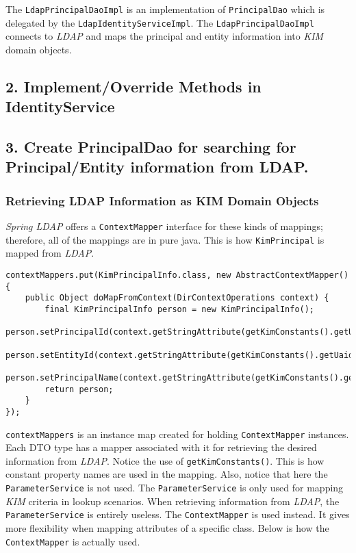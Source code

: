 \documentclass[12pt,notitlepage]{article}
\begin{document}
The \verb|LdapPrincipalDaoImpl| is an implementation of \verb|PrincipalDao| which is delegated by the 
\verb|LdapIdentityServiceImpl|. The \verb|LdapPrincipalDaoImpl| connects to \emph{LDAP} and maps the principal
and entity information into \emph{KIM} domain objects.

\subsection*{2. Implement/Override Methods in IdentityService}

\subsection*{3. Create PrincipalDao for searching for Principal/Entity information from LDAP.}
\subsubsection{Retrieving LDAP Information as KIM Domain Objects}
\emph{Spring LDAP} offers a \verb|ContextMapper| interface for these kinds of mappings; therefore, all of the
mappings are in pure java. This is how \verb|KimPrincipal| is mapped from \emph{LDAP}.

\begin{lstlisting}
contextMappers.put(KimPrincipalInfo.class, new AbstractContextMapper() {
    public Object doMapFromContext(DirContextOperations context) {
        final KimPrincipalInfo person = new KimPrincipalInfo();
        person.setPrincipalId(context.getStringAttribute(getKimConstants().getUaidLdapProperty()));
        person.setEntityId(context.getStringAttribute(getKimConstants().getUaidLdapProperty()));
        person.setPrincipalName(context.getStringAttribute(getKimConstants().getUidLdapProperty()));
        return person;
    }
});
\end{lstlisting}

\verb|contextMappers| is an instance map created for holding \verb|ContextMapper| instances. Each DTO type
has a mapper associated with it for retrieving the desired information from \emph{LDAP}. Notice the use of
\verb|getKimConstants()|. This is how constant property names are used in the mapping. Also, notice that here the 
\verb|ParameterService| is not used. The \verb|ParameterService| is only used for mapping \emph{KIM} criteria
in lookup scenarios. When retrieving information from \emph{LDAP}, the \verb|ParameterService| is entirely
useless. The \verb|ContextMapper| is used instead. It gives more flexibility when mapping attributes
of a specific class. Below is how the \verb|ContextMapper| is actually used.
\end{document}
